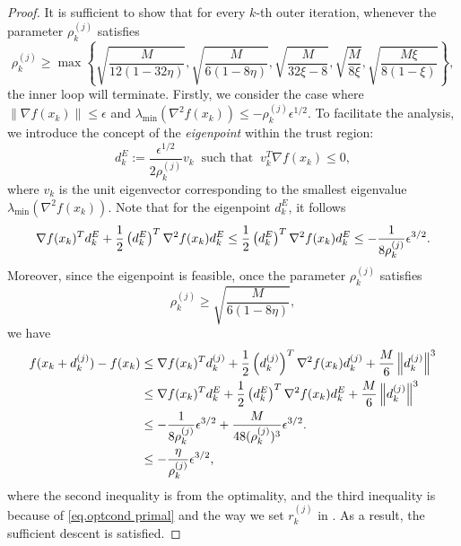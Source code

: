 \begin{proof}
    It is sufficient to show that for every $k$-th outer iteration, whenever the parameter $\rho_k^{(j)}$ satisfies
    \begin{equation}\label{eq.succ the}
        \rho_k^{(j)} \geq \max \left \{\sqrt{\frac{M}{12(1-32\eta)}},\sqrt{\frac{M}{6(1-8\eta)}},\sqrt{\frac{M}{32\xi-8}},\sqrt{\frac{M}{8\xi}},\sqrt{\frac{M\xi}{8(1-\xi)}}\right \},
    \end{equation}
    the inner loop will terminate. Firstly, we consider the case where $\|\nabla f(x_k)\|\leq \epsilon$ and $\lambda_{\min}(\nabla^2 f(x_k))\leq -\rho_k^{(j)} \epsilon^{1/2}$. To facilitate the analysis, we introduce the concept of the \emph{eigenpoint} within the trust region:
    \begin{equation}
        \label{eq.eigen point}
        d_k^E:= \frac{\epsilon^{1/2}}{2\rho_k^{(j)}}v_k \; \;\mbox{such that}\;\; v_k^T\nabla f(x_k) \leq 0,
    \end{equation}
    where $v_k$ is the unit eigenvector corresponding to the smallest eigenvalue $\lambda_{\min}(\nabla^2 f(x_k))$. Note that for the eigenpoint $d_k^E$, it follows
    \begin{equation*}
        \nabla f(x_k)^T d_k^E +\frac{1}{2}\left (d_k^E \right )^T \nabla^2 f(x_k) d_k^E\leq \frac{1}{2}\left (d_k^E \right )^T \nabla^2 f(x_k) d_k^E\leq -\frac{1}{8\rho_k^{(j)}}\epsilon^{3/2}.
    \end{equation*}
    Moreover, since the eigenpoint is feasible, once the parameter $\rho_k^{(j)}$ satisfies
    $$
        \rho_k^{(j)} \geq \sqrt{\frac{M}{6(1-8\eta)}},
    $$
    we have
    \begin{align}
        \nonumber
        f(x_k+d_k^{(j)})-f(x_k) & \leq \nabla f(x_k)^T d_k^{(j)} +\frac{1}{2}\left (d_k^{(j)} \right )^T \nabla^2 f(x_k) d_k^{(j)}+\frac{M}{6}\left\|d_k^{(j)}\right\|^3 \\
        \nonumber
                                & \leq \nabla f(x_k)^T d_k^E +\frac{1}{2}\left (d_k^E \right )^T \nabla^2 f(x_k) d_k^E+\frac{M}{6}\left\|d_k^{(j)}\right\|^3             \\
        \nonumber
                                & \leq -\frac{1}{8\rho_k^{(j)}}\epsilon^{3/2}+\frac{M}{48(\rho_k^{(j)})^3}\epsilon^{3/2}.               \\
                                & \leq -\frac{\eta}{\rho_k^{(j)}}\epsilon^{3/2},
        \label{eq.function decrease adaptive case1}
    \end{align}
    where the second inequality is from the optimality, and the third inequality is because of \eqref{eq.optcond primal} and the way we set $r_k^{(j)}$ in . As a result, the sufficient descent is satisfied.


\end{proof}
